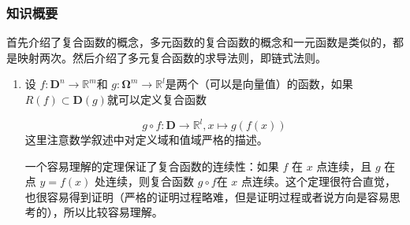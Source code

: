 \subsubsection{知识概要}
首先介绍了复合函数的概念，多元函数的复合函数的概念和一元函数是类似的，都是映射两次。然后介绍了多元复合函数的求导法则，即链式法则。
\begin{enumerate}
    \item 设 $f: \mathbf{D}^n \to \mathbb{R}^m$和 $g: \mathbf{\Omega} ^m \to \mathbb{R} ^l $是两个（可以是向量值）的函数，如果 $R(f) \subset \mathbf{D}(g) $就可以定义复合函数
    
    $$
    g \circ f : \mathbf{D} \to \mathbb{R} ^ l , x \mapsto g(f(x))
    $$
    这里注意数学叙述中对定义域和值域严格的描述。
    
    一个容易理解的定理保证了复合函数的连续性：如果 $f$ 在 $x$ 点连续，且 $g$ 在点 $y=f(x)$ 处连续，则复合函数 $g \circ f $在 $x$ 点连续。这个定理很符合直觉，也很容易得到证明（严格的证明过程略难，但是证明过程或者说方向是容易思考的），所以比较容易理解。 
    

\end{enumerate}
